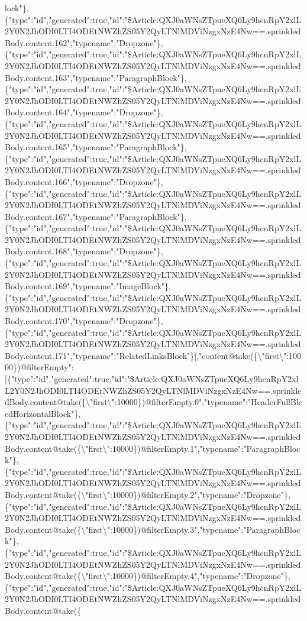 lock"\},\{"type":"id","generated":true,"id":"\$Article:QXJ0aWNsZTpueXQ6Ly9hcnRpY2xlL2Y0N2JhODI0LTI4ODEtNWZhZS05Y2QyLTNlMDViNzgxNzE4Nw==.sprinkledBody.content.162","typename":"Dropzone"\},\{"type":"id","generated":true,"id":"\$Article:QXJ0aWNsZTpueXQ6Ly9hcnRpY2xlL2Y0N2JhODI0LTI4ODEtNWZhZS05Y2QyLTNlMDViNzgxNzE4Nw==.sprinkledBody.content.163","typename":"ParagraphBlock"\},\{"type":"id","generated":true,"id":"\$Article:QXJ0aWNsZTpueXQ6Ly9hcnRpY2xlL2Y0N2JhODI0LTI4ODEtNWZhZS05Y2QyLTNlMDViNzgxNzE4Nw==.sprinkledBody.content.164","typename":"Dropzone"\},\{"type":"id","generated":true,"id":"\$Article:QXJ0aWNsZTpueXQ6Ly9hcnRpY2xlL2Y0N2JhODI0LTI4ODEtNWZhZS05Y2QyLTNlMDViNzgxNzE4Nw==.sprinkledBody.content.165","typename":"ParagraphBlock"\},\{"type":"id","generated":true,"id":"\$Article:QXJ0aWNsZTpueXQ6Ly9hcnRpY2xlL2Y0N2JhODI0LTI4ODEtNWZhZS05Y2QyLTNlMDViNzgxNzE4Nw==.sprinkledBody.content.166","typename":"Dropzone"\},\{"type":"id","generated":true,"id":"\$Article:QXJ0aWNsZTpueXQ6Ly9hcnRpY2xlL2Y0N2JhODI0LTI4ODEtNWZhZS05Y2QyLTNlMDViNzgxNzE4Nw==.sprinkledBody.content.167","typename":"ParagraphBlock"\},\{"type":"id","generated":true,"id":"\$Article:QXJ0aWNsZTpueXQ6Ly9hcnRpY2xlL2Y0N2JhODI0LTI4ODEtNWZhZS05Y2QyLTNlMDViNzgxNzE4Nw==.sprinkledBody.content.168","typename":"Dropzone"\},\{"type":"id","generated":true,"id":"\$Article:QXJ0aWNsZTpueXQ6Ly9hcnRpY2xlL2Y0N2JhODI0LTI4ODEtNWZhZS05Y2QyLTNlMDViNzgxNzE4Nw==.sprinkledBody.content.169","typename":"ImageBlock"\},\{"type":"id","generated":true,"id":"\$Article:QXJ0aWNsZTpueXQ6Ly9hcnRpY2xlL2Y0N2JhODI0LTI4ODEtNWZhZS05Y2QyLTNlMDViNzgxNzE4Nw==.sprinkledBody.content.170","typename":"Dropzone"\},\{"type":"id","generated":true,"id":"\$Article:QXJ0aWNsZTpueXQ6Ly9hcnRpY2xlL2Y0N2JhODI0LTI4ODEtNWZhZS05Y2QyLTNlMDViNzgxNzE4Nw==.sprinkledBody.content.171","typename":"RelatedLinksBlock"\}{]},"content@take(\{\textbackslash{}"first\textbackslash{}":10000\})@filterEmpty":{[}\{"type":"id","generated":true,"id":"\$Article:QXJ0aWNsZTpueXQ6Ly9hcnRpY2xlL2Y0N2JhODI0LTI4ODEtNWZhZS05Y2QyLTNlMDViNzgxNzE4Nw==.sprinkledBody.content@take(\{\textbackslash{}"first\textbackslash{}":10000\})@filterEmpty.0","typename":"HeaderFullBleedHorizontalBlock"\},\{"type":"id","generated":true,"id":"\$Article:QXJ0aWNsZTpueXQ6Ly9hcnRpY2xlL2Y0N2JhODI0LTI4ODEtNWZhZS05Y2QyLTNlMDViNzgxNzE4Nw==.sprinkledBody.content@take(\{\textbackslash{}"first\textbackslash{}":10000\})@filterEmpty.1","typename":"ParagraphBlock"\},\{"type":"id","generated":true,"id":"\$Article:QXJ0aWNsZTpueXQ6Ly9hcnRpY2xlL2Y0N2JhODI0LTI4ODEtNWZhZS05Y2QyLTNlMDViNzgxNzE4Nw==.sprinkledBody.content@take(\{\textbackslash{}"first\textbackslash{}":10000\})@filterEmpty.2","typename":"Dropzone"\},\{"type":"id","generated":true,"id":"\$Article:QXJ0aWNsZTpueXQ6Ly9hcnRpY2xlL2Y0N2JhODI0LTI4ODEtNWZhZS05Y2QyLTNlMDViNzgxNzE4Nw==.sprinkledBody.content@take(\{\textbackslash{}"first\textbackslash{}":10000\})@filterEmpty.3","typename":"ParagraphBlock"\},\{"type":"id","generated":true,"id":"\$Article:QXJ0aWNsZTpueXQ6Ly9hcnRpY2xlL2Y0N2JhODI0LTI4ODEtNWZhZS05Y2QyLTNlMDViNzgxNzE4Nw==.sprinkledBody.content@take(\{\textbackslash{}"first\textbackslash{}":10000\})@filterEmpty.4","typename":"Dropzone"\},\{"type":"id","generated":true,"id":"\$Article:QXJ0aWNsZTpueXQ6Ly9hcnRpY2xlL2Y0N2JhODI0LTI4ODEtNWZhZS05Y2QyLTNlMDViNzgxNzE4Nw==.sprinkledBody.content@take(\{\textback
